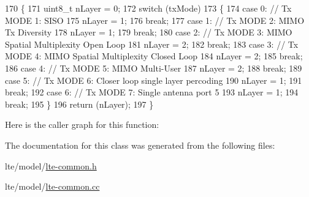 \begin{DoxyCode}
170 \{
171   uint8\_t nLayer = 0;
172   \textcolor{keywordflow}{switch} (txMode)
173     \{
174     \textcolor{keywordflow}{case} 0: \textcolor{comment}{// Tx MODE 1: SISO}
175       nLayer = 1;
176       \textcolor{keywordflow}{break};
177     \textcolor{keywordflow}{case} 1: \textcolor{comment}{// Tx MODE 2: MIMO Tx Diversity}
178       nLayer = 1;
179       \textcolor{keywordflow}{break};
180     \textcolor{keywordflow}{case} 2: \textcolor{comment}{// Tx MODE 3: MIMO Spatial Multiplexity Open Loop}
181       nLayer = 2;
182       \textcolor{keywordflow}{break};
183     \textcolor{keywordflow}{case} 3: \textcolor{comment}{// Tx MODE 4: MIMO Spatial Multiplexity Closed Loop}
184       nLayer = 2;
185       \textcolor{keywordflow}{break};
186     \textcolor{keywordflow}{case} 4: \textcolor{comment}{// Tx MODE 5: MIMO Multi-User}
187       nLayer = 2;
188       \textcolor{keywordflow}{break};
189     \textcolor{keywordflow}{case} 5: \textcolor{comment}{// Tx MODE 6: Closer loop single layer percoding}
190       nLayer = 1;
191       \textcolor{keywordflow}{break};
192     \textcolor{keywordflow}{case} 6: \textcolor{comment}{// Tx MODE 7: Single antenna port 5}
193       nLayer = 1;
194       \textcolor{keywordflow}{break};
195     \}
196   \textcolor{keywordflow}{return} (nLayer);
197 \}
\end{DoxyCode}


Here is the caller graph for this function\+:




The documentation for this class was generated from the following files\+:\begin{DoxyCompactItemize}
\item 
lte/model/\hyperlink{lte-common_8h}{lte-\/common.\+h}\item 
lte/model/\hyperlink{lte-common_8cc}{lte-\/common.\+cc}\end{DoxyCompactItemize}
